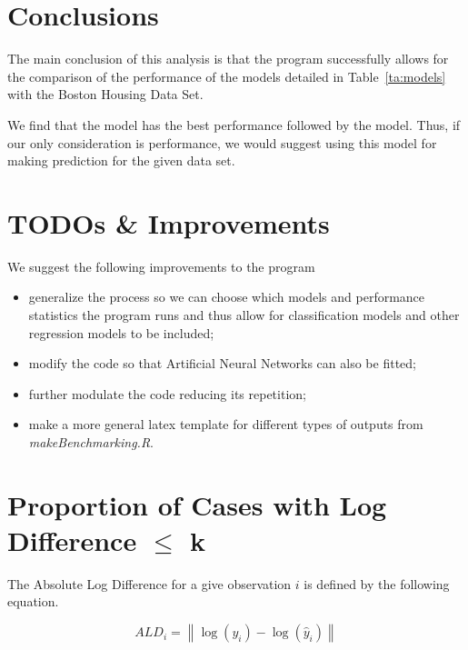 \documentclass[10pt, letterpaper ]{article}
\begin{document}
\section{Conclusions}

The main conclusion of this analysis is that the program successfully allows for the comparison of the performance of the models detailed in Table~\ref{ta:models} with the Boston Housing Data Set. 

We find that the \sBestModel{} model has the best performance followed by the \sSecondBestModel{} model. Thus, if our only consideration is performance, we would suggest using this model for making prediction for the given data set.


\appendix

\newpage


\section{TODOs \& Improvements}

We suggest the following improvements to the program
\begin{itemize} 
\item generalize the process so we can choose which models and performance statistics the program runs and thus allow for classification models and other regression models to be included;
\item modify the code so that Artificial Neural Networks can also be fitted;
\item further modulate the code reducing its repetition; 
\item make a more general latex template for different types of outputs from \emph{makeBenchmarking.R}.
\end{itemize}

\section{Proportion of Cases with Log Difference $\le$ k}
\label{sec:log-change}

The Absolute Log Difference for a give observation $i$ is defined by the following equation.

\begin{equation}
ALD_i = \left\| \log\left(   y_i \right) -\log\left( \hat{y}_i \right) \right\| 
\label{eq:lchange}
\end{equation}
\end{document}
